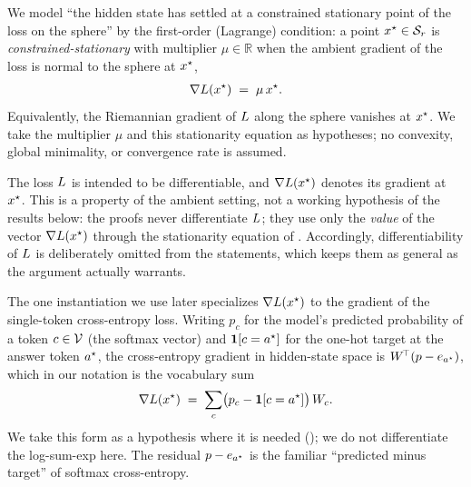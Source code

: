 \begin{definition}
\label{def:stationarity}
We model ``the hidden state has settled at a constrained stationary point of the loss on the
sphere'' by the first-order (Lagrange) condition: a point $x^{\star} \in \mathcal{S}_r$ is
\emph{constrained-stationary} with multiplier $\mu \in \mathbb{R}$ when the ambient gradient
of the loss is normal to the sphere at $x^{\star}$,
\begin{align*}
\nabla L(x^{\star}) \;=\; \mu\,x^{\star}.
\end{align*}
Equivalently, the Riemannian gradient of $L$ along the sphere vanishes at $x^{\star}$. We
take the multiplier $\mu$ and this stationarity equation as hypotheses; no convexity, global
minimality, or convergence rate is assumed.
\end{definition}

\begin{remark}
\label{rem:differentiability}
The loss $L$ is intended to be differentiable, and $\nabla L(x^{\star})$ denotes its
gradient at $x^{\star}$. This is a property of the ambient setting, not a working hypothesis of
the results below: the proofs never differentiate $L$; they use only the \emph{value} of
the vector $\nabla L(x^{\star})$ through the stationarity equation of
. Accordingly, differentiability of $L$ is deliberately omitted
from the statements, which keeps them as general as the argument actually warrants.
\end{remark}

\begin{remark}
\label{rem:ce-setup}
The one instantiation we use later specializes $\nabla L(x^{\star})$ to the gradient of the
single-token cross-entropy loss. Writing $p_c$ for the model's predicted probability of a
token $c \in \mathcal{V}$ (the softmax vector) and $\mathbf{1}\!\left[c = a^{\star}\right]$ for the one-hot target %
at the answer token $a^{\star}$, the cross-entropy gradient in hidden-state space is
$W^{\!\top}(p - e_{a^{\star}})$, which in our notation is the vocabulary sum
\begin{align*}
\nabla L(x^{\star}) \;=\; \sum_{c} \bigl(p_c - \mathbf{1}\!\left[c = a^{\star}\right]\bigr)\, W_c .
\end{align*}
We take this form as a hypothesis where it is needed (); we do not differentiate
the log-sum-exp here. The residual $p - e_{a^{\star}}$ is the familiar ``predicted minus target''
of softmax cross-entropy.
\end{remark}
